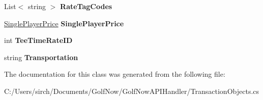 \begin{DoxyCompactItemize}
List$<$ string $>$ {\bfseries Rate\+Tag\+Codes}
\item 
\mbox{\label{class_golf_now_a_p_i_handler_1_1_rate_a5493d2fdc91d011ca06078cfb9e02646}} 
\mbox{\hyperlink{class_golf_now_a_p_i_handler_1_1_single_player_price}{Single\+Player\+Price}} {\bfseries Single\+Player\+Price}
\item 
\mbox{\label{class_golf_now_a_p_i_handler_1_1_rate_a9036f59d8a954d0331ccd2c1b88d52c6}} 
int {\bfseries Tee\+Time\+Rate\+ID}
\item 
\mbox{\label{class_golf_now_a_p_i_handler_1_1_rate_a280ce535f62dc8f732d8a2926a3e170a}} 
string {\bfseries Transportation}
\end{DoxyCompactItemize}


The documentation for this class was generated from the following file\+:\begin{DoxyCompactItemize}
\item 
C\+:/\+Users/sirch/\+Documents/\+Golf\+Now/\+Golf\+Now\+A\+P\+I\+Handler/Transaction\+Objects.\+cs\end{DoxyCompactItemize}
